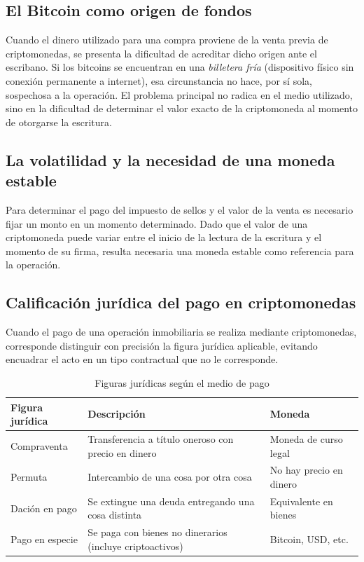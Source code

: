 \documentclass[12pt,oneside]{book}
\begin{document}
\subsection{El Bitcoin como origen de fondos}

Cuando el dinero utilizado para una compra proviene de la venta previa de criptomonedas, se presenta la dificultad de acreditar dicho origen ante el escribano. Si los bitcoins se encuentran en una \textit{billetera fría} (dispositivo físico sin conexión permanente a internet), esa circunstancia no hace, por sí sola, sospechosa a la operación. El problema principal no radica en el medio utilizado, sino en la dificultad de determinar el valor exacto de la criptomoneda al momento de otorgarse la escritura.

\subsection{La volatilidad y la necesidad de una moneda estable}

Para determinar el pago del impuesto de sellos y el valor de la venta es necesario fijar un monto en un momento determinado. Dado que el valor de una criptomoneda puede variar entre el inicio de la lectura de la escritura y el momento de su firma, resulta necesaria una moneda estable como referencia para la operación.

\subsection{Calificación jurídica del pago en criptomonedas}

Cuando el pago de una operación inmobiliaria se realiza mediante criptomonedas, corresponde distinguir con precisión la figura jurídica aplicable, evitando encuadrar el acto en un tipo contractual que no le corresponde.

\begin{table}[H]
\centering
\caption{Figuras jurídicas según el medio de pago}
\begin{tabularx}{\textwidth}{>{\raggedright\arraybackslash}X >{\raggedright\arraybackslash}X >{\raggedright\arraybackslash}X}
\toprule
\textbf{Figura jurídica} & \textbf{Descripción} & \textbf{Moneda} \\
\midrule
Compraventa & Transferencia a título oneroso con precio en dinero & Moneda de curso legal \\
Permuta & Intercambio de una cosa por otra cosa & No hay precio en dinero \\
Dación en pago & Se extingue una deuda entregando una cosa distinta & Equivalente en bienes \\
Pago en especie & Se paga con bienes no dinerarios (incluye criptoactivos) & Bitcoin, USD, etc. \\
\bottomrule
\end{tabularx}
\end{table}
\end{document}
